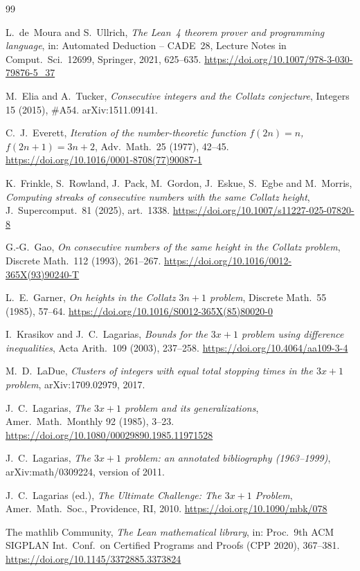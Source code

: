 \documentclass[11pt]{amsart}
\theoremstyle{definition}
\theoremstyle{remark}
\begin{document}
\begin{thebibliography}{99}

 L.~de~Moura and S.~Ullrich, \emph{The Lean~4 theorem prover and programming language}, in: Automated Deduction -- CADE~28, Lecture Notes in Comput.\ Sci.\ 12699, Springer, 2021, 625--635. \url{https://doi.org/10.1007/978-3-030-79876-5_37}

 M.~Elia and A.~Tucker, \emph{Consecutive integers and the Collatz conjecture}, Integers 15 (2015), \#A54. arXiv:1511.09141.

 C.~J.~Everett, \emph{Iteration of the number-theoretic function $f(2n)=n$, $f(2n+1)=3n+2$}, Adv.\ Math.\ 25 (1977), 42--45. \url{https://doi.org/10.1016/0001-8708(77)90087-1}

 K.~Frinkle, S.~Rowland, J.~Pack, M.~Gordon, J.~Eskue, S.~Egbe and M.~Morris, \emph{Computing streaks of consecutive numbers with the same Collatz height}, J.~Supercomput.\ 81 (2025), art.~1338. \url{https://doi.org/10.1007/s11227-025-07820-8}

 G.-G.~Gao, \emph{On consecutive numbers of the same height in the Collatz problem}, Discrete Math.\ 112 (1993), 261--267. \url{https://doi.org/10.1016/0012-365X(93)90240-T}

 L.~E.~Garner, \emph{On heights in the Collatz $3n+1$ problem}, Discrete Math.\ 55 (1985), 57--64. \url{https://doi.org/10.1016/S0012-365X(85)80020-0}

 I.~Krasikov and J.~C.~Lagarias, \emph{Bounds for the $3x+1$ problem using difference inequalities}, Acta Arith.\ 109 (2003), 237--258. \url{https://doi.org/10.4064/aa109-3-4}

 M.~D.~LaDue, \emph{Clusters of integers with equal total stopping times in the $3x+1$ problem}, arXiv:1709.02979, 2017.

 J.~C.~Lagarias, \emph{The $3x+1$ problem and its generalizations}, Amer.\ Math.\ Monthly 92 (1985), 3--23. \url{https://doi.org/10.1080/00029890.1985.11971528}

 J.~C.~Lagarias, \emph{The $3x+1$ problem: an annotated bibliography (1963--1999)}, arXiv:math/0309224, version of 2011.

 J.~C.~Lagarias (ed.), \emph{The Ultimate Challenge: The $3x+1$ Problem}, Amer.\ Math.\ Soc., Providence, RI, 2010. \url{https://doi.org/10.1090/mbk/078}

 The mathlib Community, \emph{The Lean mathematical library}, in: Proc.\ 9th ACM SIGPLAN Int.\ Conf.\ on Certified Programs and Proofs (CPP 2020), 367--381. \url{https://doi.org/10.1145/3372885.3373824}


\end{thebibliography}
\end{document}
